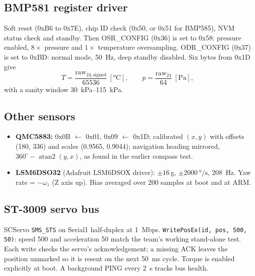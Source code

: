 \documentclass[11pt,a4paper]{article}
\newcommand{\code}[1]{\texttt{#1}}
\begin{document}
\subsection{BMP581 register driver}
Soft reset (0xB6 to 0x7E), chip ID check (0x50, or 0x51 for BMP585), NVM
status check and standby. Then OSR\_CONFIG (0x36) is set to 0x58: pressure
enabled, $8\times$ pressure and $1\times$ temperature oversampling. ODR\_CONFIG (0x37) is set to 0xBD: normal mode, \SI{50}{\hertz}, deep standby
disabled. Six bytes from
0x1D give
\begin{equation}
  T = \frac{\text{raw}_{24,\text{signed}}}{65536}\ [\si{\celsius}], \qquad
  p = \frac{\text{raw}_{24}}{64}\ [\si{\pascal}],
\end{equation}
with a sanity window \SIrange{30}{115}{\kilo\pascal}.

\subsection{Other sensors}
\begin{itemize}
  \item \textbf{QMC5883:} 0x0B $\leftarrow$ 0x01, 0x09 $\leftarrow$ 0x1D;
        calibrated $(x,y)$ with offsets (180, 336) and scales
        (0.9565, 0.9044); navigation heading mirrored, $360^\circ -
        \operatorname{atan2}(y,x)$, as found in the earlier compass test.
  \item \textbf{LSM6DSO32} (Adafruit LSM6DSOX driver): $\pm16$\,g,
        $\pm\SI{2000}{\degree\per\second}$, \SI{208}{\hertz}. Yaw rate =
        $-\omega_z$ (Z axis up). Bias averaged over 200 samples at boot and
        at ARM.
\end{itemize}

\subsection{ST-3009 servo bus}
SCServo \code{SMS\_STS} on Serial1 half-duplex at \SI{1}{Mbps}.
\code{WritePosEx(id, pos, 500, 50)}: speed 500 and acceleration 50 match the
team's working stand-alone test. Each write checks the servo's
acknowledgement; a missing ACK leaves the position unmarked so it is resent
on the next \SI{50}{\milli\second} cycle. Torque is enabled explicitly at
boot. A background PING every \SI{2}{\second} tracks bus health.
\end{document}
